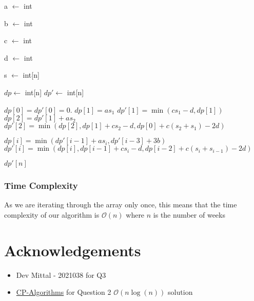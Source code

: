 \documentclass[12pt]{article}
\begin{document}
\begin{algorithm}
    \begin{algorithmic}
        \Require a $\leftarrow$ int 

        \Require b $\leftarrow$ int 

        \Require c $\leftarrow$ int 

        \Require d $\leftarrow$ int 

        \Require s $\leftarrow$ int[n] 

        \State $dp \leftarrow$ int[n]
        \State $dp' \leftarrow$ int[n]
        

        \State $dp[0] = dp'[0] = 0$.
        \State $dp[1] = a s_1$
        \State $dp'[1] = \min(c s_1 - d, dp[1])$
        \State $dp[2] = dp'[1] + a s_2$
        \State $dp'[2] = \min(dp[2], dp[1] + c s_2 - d, dp[0] + c(s_2 + s_1) - 2 d)$

            \State $dp[i] = \min(dp'[i-1] + a s_i, dp'[i-3] + 3b)$
            \State $dp'[i] = \min(dp[i], dp[i-1] + c s_i - d, dp[i-2] + c(s_i + s_{i-1}) - 2 d)$
        
        \EndFor
        
        \Return $dp'[n]$

        
        
    \end{algorithmic}
\end{algorithm}

\subsubsection{Time Complexity}

As we are iterating through the array only once, this means that the time complexity of our algorithm is $\mathcal{O}(n)$ where $n$ is the number of weeks 


\section{Acknowledgements}

\begin{itemize}
    \item Dev Mittal - 2021038 for Q3
    \item \href{https://cp-algorithms.com/sequences/longest_increasing_subsequence.html#solution-in-on-log-n-with-dynamic-programming-and-binary-search}{CP-Algorithms} for Question 2 $\mathcal{O}(n\log(n))$ solution
\end{itemize}
\end{document}
